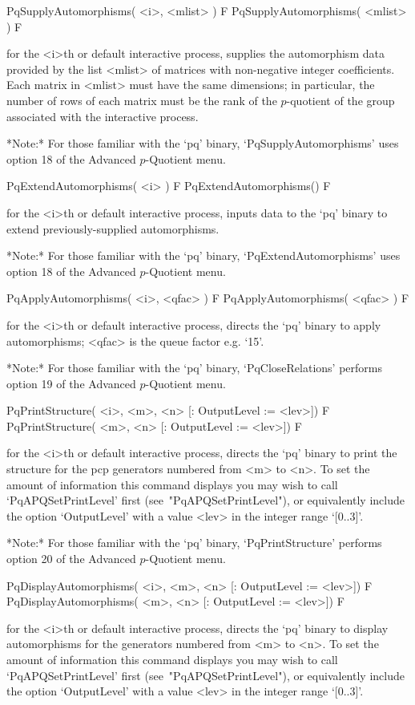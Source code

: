 \>PqSupplyAutomorphisms( <i>, <mlist> ) F
\>PqSupplyAutomorphisms( <mlist> ) F

for the <i>th or  default  interactive  {\ANUPQ}  process,  supplies  the
automorphism  data  provided  by  the  list  <mlist>  of  matrices   with
non-negative integer coefficients. Each matrix in <mlist> must  have  the
same dimensions; in particular, the number of rows of each matrix must be
the rank of the $p$-quotient of the group associated with the interactive
{\ANUPQ} process.

*Note:* 
For those familiar with the  `pq'  binary,  `PqSupplyAutomorphisms'  uses
option 18 of the Advanced $p$-Quotient menu.

\>PqExtendAutomorphisms( <i> ) F
\>PqExtendAutomorphisms() F

for the <i>th or default interactive {\ANUPQ} process, inputs data to the
`pq' binary to extend previously-supplied automorphisms.

*Note:*
For those familiar with the  `pq'  binary,  `PqExtendAutomorphisms'  uses
option 18 of the Advanced $p$-Quotient menu.

\>PqApplyAutomorphisms( <i>, <qfac> ) F
\>PqApplyAutomorphisms( <qfac> ) F

for the <i>th or default interactive {\ANUPQ} process, directs  the  `pq'
binary to apply automorphisms; <qfac> is the queue factor e.g. `15'.

*Note:* 
For those familiar with  the  `pq'  binary,  `PqCloseRelations'  performs
option 19 of the Advanced $p$-Quotient menu.

\>PqPrintStructure( <i>, <m>, <n> [: OutputLevel := <lev>]) F
\>PqPrintStructure( <m>, <n> [: OutputLevel := <lev>]) F

for the <i>th or default interactive {\ANUPQ} process, directs  the  `pq'
binary to print the structure for the pcp generators numbered from <m> to
<n>. To set the amount of information this command displays you may  wish
to  call  `PqAPQSetPrintLevel'   first   (see~"PqAPQSetPrintLevel"),   or
equivalently include the option `OutputLevel' with a value <lev>  in  the
integer range `[0..3]'.


*Note:* 
For those familiar with  the  `pq'  binary,  `PqPrintStructure'  performs
option 20 of the Advanced $p$-Quotient menu.

\>PqDisplayAutomorphisms( <i>, <m>, <n> [: OutputLevel := <lev>]) F
\>PqDisplayAutomorphisms( <m>, <n> [: OutputLevel := <lev>]) F

for the <i>th or default interactive {\ANUPQ} process, directs  the  `pq'
binary to display automorphisms for the generators numbered from  <m>  to
<n>. To set the amount of information this command displays you may  wish
to  call  `PqAPQSetPrintLevel'   first   (see~"PqAPQSetPrintLevel"),   or
equivalently include the option `OutputLevel' with a value <lev>  in  the
integer range `[0..3]'.

